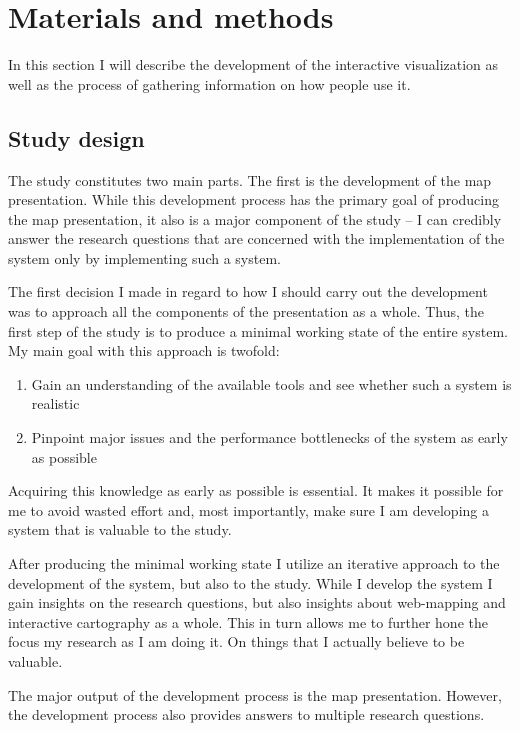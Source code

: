 \section{Materials and methods}
In this section I will describe the development of the interactive visualization
as well as the process of gathering information on how people use it.

\subsection{Study design}

The study constitutes two main parts.
The first is the development of the map presentation.
While this development process has the primary goal of producing the map presentation,
it also is a major component of the study --
I can credibly answer the research questions that are concerned with the implementation of the system
only by implementing such a system.

The first decision I made in regard to
how I should carry out the development
was to approach all the components of the presentation as a whole.  %
Thus, the first step of the study is
to produce a minimal working state of the entire system.
My main goal with this approach is twofold:
\begin{enumerate}
	\item Gain an understanding of the available tools and see whether such a system is realistic
	\item Pinpoint major issues and the performance bottlenecks of the system as early as possible
\end{enumerate}

Acquiring this knowledge as early as possible is essential.
It makes it possible for me to avoid wasted effort and, most importantly,
make sure I am developing a system that is valuable to the study.

After producing the minimal working state I utilize an iterative approach
to the development of the system, but also to the study.
While I develop the system I gain insights on the research questions, but also insights about web-mapping and interactive cartography as a whole.
This in turn allows me to further hone the focus my research as I am doing it.
On things that I actually believe to be valuable.  %

The major output of the development process is the map presentation.
However, the development process also provides answers to multiple research questions.

